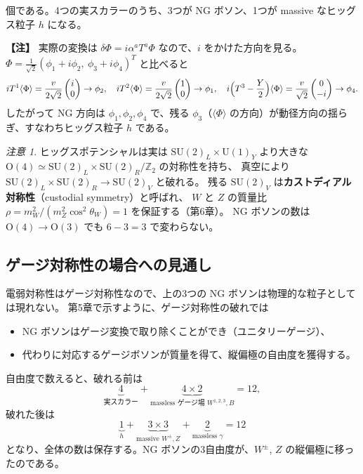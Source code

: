 \documentclass[uplatex,dvipdfmx,a4paper,11pt,openany]{jsbook}
\newcommand{\term}[2]{\textbf{#1}（#2）}
\newenvironment{note}{\vspace{1ex}\par\footnotesize\noindent\textbf{【注】}}{\par\vspace{1ex}}
\numberwithin{equation}{chapter}
\theoremstyle{definition}
\theoremstyle{plain}
\theoremstyle{remark}
\newtheorem{remark}{注意}[chapter]
\newcommand{\SU}{\mathrm{SU}}
\newcommand{\U}{\mathrm{U}}
\begin{document}
個である。4つの実スカラーのうち、3つが NG ボソン、1つが massive なヒッグス粒子 $h$ になる。
\begin{note}
実際の変換は $\delta\Phi=i\alpha^aT^a\Phi$ なので、$i$ をかけた方向を見る。
$\Phi=\frac{1}{\sqrt2}(\phi_1+i\phi_2,\ \phi_3+i\phi_4)^T$ と比べると
\[
iT^1\langle\Phi\rangle=\frac{v}{2\sqrt2}\begin{pmatrix}i\\0\end{pmatrix}\to\phi_2,\quad
iT^2\langle\Phi\rangle=\frac{v}{2\sqrt2}\begin{pmatrix}1\\0\end{pmatrix}\to\phi_1,\quad
i\Bigl(T^3-\frac Y2\Bigr)\langle\Phi\rangle=\frac{v}{\sqrt2}\begin{pmatrix}0\\-i\end{pmatrix}\to\phi_4 .
\]
したがって NG 方向は $\phi_1,\phi_2,\phi_4$ で、残る $\phi_3$（$\langle\Phi\rangle$ の方向）が動径方向の揺らぎ、すなわちヒッグス粒子 $h$ である。
\end{note}
\begin{remark}
ヒッグスポテンシャルは実は $\SU(2)_L\times\U(1)_Y$ より大きな $\mathrm O(4)\simeq\SU(2)_L\times\SU(2)_R/\mathbb Z_2$ の対称性を持ち、
真空により $\SU(2)_L\times\SU(2)_R\to\SU(2)_V$ と破れる。
残る $\SU(2)_V$ は\term{カストディアル対称性}{custodial symmetry}と呼ばれ、
$W$ と $Z$ の質量比 $\rho=m_W^2/(m_Z^2\cos^2\theta_W)=1$ を保証する（第6章）。
NG ボソンの数は $\mathrm O(4)\to\mathrm O(3)$ でも $6-3=3$ で変わらない。
\end{remark}
\subsection{ゲージ対称性の場合への見通し}
電弱対称性はゲージ対称性なので、上の3つの NG ボソンは物理的な粒子としては現れない。
第5章で示すように、ゲージ対称性の破れでは
\begin{itemize}
    \item NG ボソンはゲージ変換で取り除くことができ（ユニタリーゲージ）、
    \item 代わりに対応するゲージボソンが質量を得て、縦偏極の自由度を獲得する。
\end{itemize}
自由度で数えると、破れる前は
\[
\underbrace{4}_{\text{実スカラー}}+\underbrace{4\times2}_{\text{massless ゲージ場 }W^{1,2,3},B}=12,
\]
破れた後は
\[
\underbrace{1}_{h}+\underbrace{3\times3}_{\text{massive }W^\pm,Z}+\underbrace{2}_{\text{massless }\gamma}=12
\]
となり、全体の数は保存する。NG ボソンの3自由度が、$W^\pm$, $Z$ の縦偏極に移ったのである。
\end{document}
